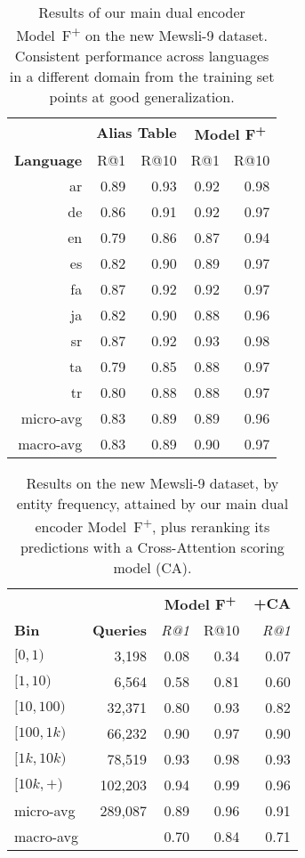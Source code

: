 \documentclass[11pt,a4paper]{article}
\begin{document}
\begin{table}[t]
\centering
\begin{tabular}{r rrrr} \toprule
& \multicolumn{2}{c}{\bf Alias Table} & \multicolumn{2}{c}{\bf Model F\textsuperscript{+}} \\ \cmidrule(lr){2-3} \cmidrule(lr){4-5}
\textbf{Language} & R@1 & R@10 & R@1 & R@10 \\ \midrule
ar & 0.89 & 0.93 & 0.92 & 0.98 \\
de & 0.86 & 0.91 & 0.92 & 0.97 \\
en & 0.79 & 0.86 & 0.87 & 0.94 \\
es & 0.82 & 0.90 & 0.89 & 0.97 \\
fa & 0.87 & 0.92 & 0.92 & 0.97 \\
ja & 0.82 & 0.90 & 0.88 & 0.96 \\
sr & 0.87 & 0.92 & 0.93 & 0.98 \\
ta & 0.79 & 0.85 & 0.88 & 0.97 \\
tr & 0.80 & 0.88 & 0.88 & 0.97 \\ \midrule
micro-avg & 0.83 & 0.89 & 0.89 & 0.96 \\
macro-avg & 0.83 & 0.89 & 0.90 & 0.97 \\ \bottomrule
\end{tabular}
\caption{Results of our main dual encoder Model~F\textsuperscript{+} on the new Mewsli-9 dataset.
Consistent performance across languages in a different domain from the training set points at good generalization.
\label{tab:wn9_results_main}}
\end{table}

\begin{table}[t]
\small
\centering
\begin{tabular}{l rrr r} \toprule
& & \multicolumn{2}{c}{\bf Model F\textsuperscript{+}} & \multicolumn{1}{c}{\bf +CA} \\ 
\cmidrule(lr){3-4}
\cmidrule(lr){5-5}
\textbf{Bin} & \textbf{Queries}  & \emph{R@1} & R@10 & \emph{R@1} \\
\midrule
$[0, 1)$ & 3,198 & 0.08 & 0.34 & 0.07 \\
$[1, 10)$  & 6,564 & 0.58 & 0.81 & 0.60 \\
$[10, 100)$ & 32,371 & 0.80 & 0.93 & 0.82 \\
$[100, 1k)$ & 66,232 & 0.90 & 0.97 & 0.90 \\
$[1k, 10k)$ & 78,519 & 0.93 & 0.98 & 0.93 \\
$[10k, +)$  & 102,203 & 0.94 & 0.99 & 0.96 \\ \midrule
micro-avg & 289,087 & 0.89 & 0.96 & 0.91 \\
macro-avg &  & 0.70 & 0.84 & 0.71 \\ \bottomrule
\end{tabular}
\caption{Results on the new Mewsli-9 dataset, by entity frequency, attained by our main dual encoder Model~F\textsuperscript{+}, plus reranking its predictions with a Cross-Attention scoring model (CA).
\label{tab:wn9_results_bin}}
\end{table}
\end{document}
